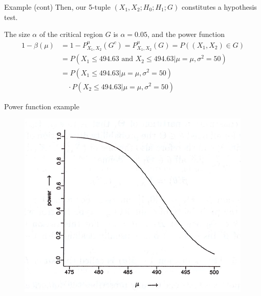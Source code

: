 \documentclass{beamer}
\begin{document}
\begin{frame}{Example (cont)}
	Then, our 5-tuple $(X_1,X_2;H_0;H_1;G)$ constitutes a hypothesis test. 
	
	The size $\alpha$ of the critical region $G$ is $\alpha=0.05$, and the power function
	\begin{equation*}
		\begin{split}
			1-\beta(\mu)&= 1-P^\mu_{X_1,X_2}(G^c)= P^\mu_{X_1,X_2}(G)= P((X_1,X_2)\in G)\\
			&=P(X_1 \le 494.63 \text{ and } X_2 \le 494.63| \mu=\mu, \sigma^2=50) \\
			&=P(X_1 \le 494.63 | \mu=\mu, \sigma^2=50)\\
			&\quad  \cdot P(X_2\le 494.63 | \mu=\mu, \sigma^2=50) 
		\end{split}
	\end{equation*}
\end{frame}

\begin{frame}{Power function example}
	\begin{figure}[h]
	\centering
	\includegraphics[scale=0.8]{../../Figures/fig_power_function.png}
\end{figure}	
\end{frame}
\end{document}
